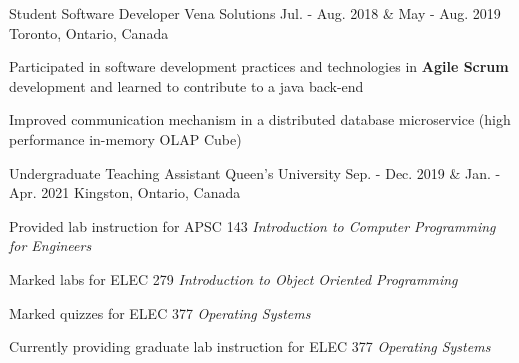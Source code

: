 \begin{cventries}
  \cventry
    {Student Software Developer} %
    {Vena Solutions} %
    {Jul. - Aug. 2018 \& May - Aug. 2019} %
    {Toronto, Ontario, Canada} %
    {
      \begin{cvitems} %
        \item{Participated in software development practices and technologies in \textbf{Agile Scrum} development and learned to contribute to a java back-end}
        \item{Improved communication mechanism in a distributed database microservice (high performance in-memory OLAP Cube)}
      \end{cvitems}
    }

  \cventry
    {Undergraduate Teaching Assistant} %
    {Queen's University} %
    {Sep. - Dec. 2019 \& Jan. - Apr. 2021} %
    {Kingston, Ontario, Canada} %
    {
      \begin{cvitems} %
        \item{Provided lab instruction for APSC 143 \textit{Introduction to Computer Programming for Engineers}}
        \item{Marked labs for ELEC 279 \textit{Introduction to Object Oriented Programming}}
        \item{Marked quizzes for ELEC 377 \textit{Operating Systems}}
        \item{Currently providing graduate lab instruction for ELEC 377 \textit{Operating Systems}}
      \end{cvitems}
    }


\end{cventries}
